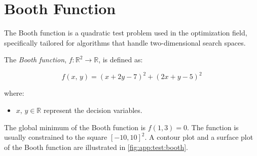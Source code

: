 \section{Booth Function}
\label{sec:app:test:booth}

  The Booth function is a quadratic test problem used in the optimization field,
  specifically tailored for algorithms that handle two-dimensional search spaces.

  \begin{definition}
    \label{def:app:test:booth}
    The \emph{Booth function}, \(f: \mathbb{R}^2 \rightarrow \mathbb{R}\), is 
    defined as:

    \begin{equation}
    \label{eq:app:test:booth}
      f(x,\, y) = (x + 2y - 7)^2 + (2x + y - 5)^2
    \end{equation}
    
    where:
    \begin{itemize}
      \item \(x,\, y \in \mathbb{R}\) represent the decision variables.
    \end{itemize}
  \end{definition}

  The global minimum of the Booth function is \(f(1, 3) = 0\).
  The function is usually constrained to the square \([-10, 10]^2\).
  A contour plot and a surface plot of the Booth function are illustrated in 
  \vref{fig:app:test:booth}.

